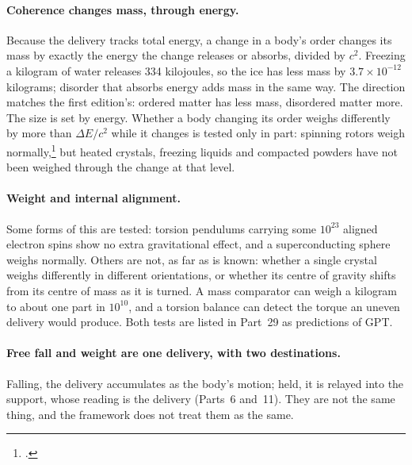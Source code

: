 \documentclass[11pt,a4paper]{article}
\newcommand{\fn}[1]{\footnote{\citealp{#1}.}}
\begin{document}
\paragraph{Coherence changes mass, through energy.} Because the delivery tracks total energy, a change in a body's order changes its mass by exactly the energy the change releases or absorbs, divided by $c^2$. Freezing a kilogram of water releases 334 kilojoules, so the ice has less mass by $3.7\times10^{-12}$ kilograms; disorder that absorbs energy adds mass in the same way. The direction matches the first edition's: ordered matter has less mass, disordered matter more. The size is set by energy.  Whether a body changing its order weighs differently by more than $\Delta E/c^2$ while it changes is tested only in part: spinning rotors weigh normally,\fn{faller1990} but heated crystals, freezing liquids and compacted powders have not been weighed through the change at that level. 

\paragraph{Weight and internal alignment.}  Some forms of this are tested: torsion pendulums carrying some $10^{23}$ aligned electron spins show no extra gravitational effect, and a superconducting sphere weighs normally. Others are not, as far as is known: whether a single crystal weighs differently in different orientations, or whether its centre of gravity shifts from its centre of mass as it is turned. A mass comparator can weigh a kilogram to about one part in $10^{10}$, and a torsion balance can detect the torque an uneven delivery would produce. Both tests are listed in Part~29 as predictions of GPT.

\paragraph{Free fall and weight are one delivery, with two destinations.} Falling, the delivery accumulates as the body's motion; held, it is relayed into the support, whose reading is the delivery (Parts~6 and~11). They are not the same thing, and the framework does not treat them as the same.
\end{document}

